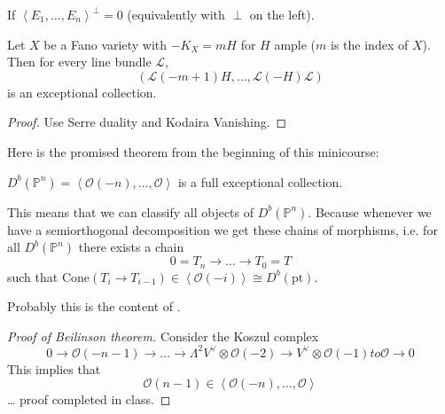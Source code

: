 \begin{definition}
\label{definition-full-exceptional-collection}
If $\left<E_1,\ldots,E_n\right>^\perp=0$ (equivalently with $\perp$ on the
left).
\end{definition}

\begin{exercise}
\label{exercise-exceptional-collections-for-Fano}
Let $X$ be a Fano variety with $-K_X=mH$ for $H$ ample ($m$ is the index of
$X$). Then for every line bundle $\mathcal{L}$,
$$
(\mathcal{L}(-m+1)H,\ldots,\mathcal{L}(-H)\mathcal{L})
$$
is an exceptional collection.
\end{exercise}

\begin{proof}
Use Serre duality and Kodaira Vanishing.
\end{proof}

\medskip\noindent
Here is the promised theorem from the beginning of this minicourse:

\begin{theorem}[Beilinson]
\label{theorem-Beilinson}
$D^b(\mathbb{P}^n)=\left<\mathcal{O}(-n),\ldots,\mathcal{O}\right>$ is a full
exceptional collection.
\end{theorem}

This means that we can classify all objects of $D^b(\mathbb{P}^n)$. Because 
whenever we have a semiorthogonal decomposition we get 
these chains of morphisms, i.e. for all $D^b(\mathbb{P}^n)$ there exists a chain 
$$
0=T_n \to \ldots \to T_0=T
$$
such that $\text{Cone}(T_i \to T_{i-1}) \in \left<\mathcal{O}(-i)\right> \cong
D^b(\text{pt})$.

Probably this is the content of \cite{Beilinson-derived}.

\begin{proof}[Proof of Beilinson theorem]
Consider the Koszul complex
$$
0\to \mathcal{O}(-n-1)\to\ldots \to \Lambda^{2}V^\vee \otimes \mathcal{O}(-2)
\to V^{\vee}\otimes \mathcal{O}(-1) to \mathcal{O} \to0
$$
This implies that
$$
\mathcal{O}(n-1) \in \left< \mathcal{O}(-n),\ldots,\mathcal{O}\right>
$$
… proof completed in class.
\end{proof}




